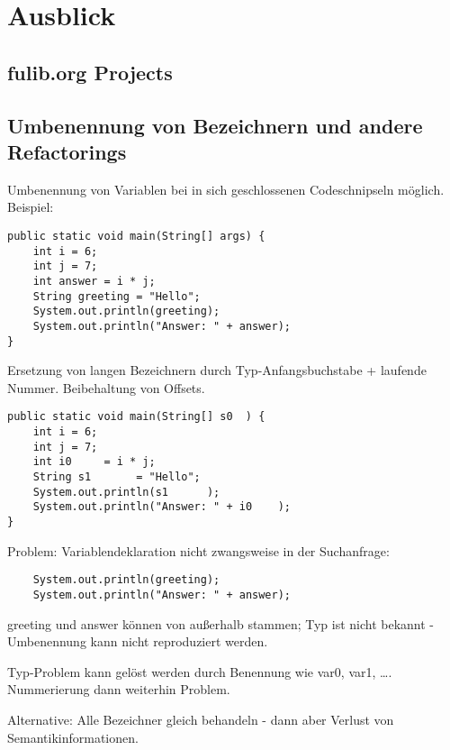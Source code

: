 \chapter{Ausblick}\label{ch:future-work}


\section{fulib.org Projects}\label{sec:future-projects}

\section{Umbenennung von Bezeichnern und andere Refactorings}\label{sec:renaming-and-refactoring}


Umbenennung von Variablen bei in sich geschlossenen Codeschnipseln möglich.
Beispiel:

\begin{verbatim}
public static void main(String[] args) {
    int i = 6;
    int j = 7;
    int answer = i * j;
    String greeting = "Hello";
    System.out.println(greeting);
    System.out.println("Answer: " + answer);
}
\end{verbatim}

Ersetzung von langen Bezeichnern durch Typ-Anfangsbuchstabe + laufende Nummer.
Beibehaltung von Offsets.

\begin{verbatim}
public static void main(String[] s0  ) {
    int i = 6;
    int j = 7;
    int i0     = i * j;
    String s1       = "Hello";
    System.out.println(s1      );
    System.out.println("Answer: " + i0    );
}
\end{verbatim}

Problem: Variablendeklaration nicht zwangsweise in der Suchanfrage:

\begin{verbatim}
    System.out.println(greeting);
    System.out.println("Answer: " + answer);
\end{verbatim}

greeting und answer können von außerhalb stammen;
Typ ist nicht bekannt -
Umbenennung kann nicht reproduziert werden.

Typ-Problem kann gelöst werden durch Benennung wie var0, var1, \ldots.
Nummerierung dann weiterhin Problem.

Alternative: Alle Bezeichner gleich behandeln - dann aber Verlust von Semantikinformationen.
